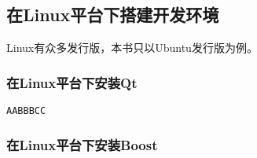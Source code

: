 ﻿%




%


\subsection{
在Linux平台下搭建开发环境
}\label{s000210}


Linux有众多发行版，本书只以Ubuntu发行版为例。


\subsubsection{
在Linux平台下安装Qt
}\label{ss000410}



\label{command000000}    %
\begin{lstlisting}[caption=GoodLuck,
title=\commandnumbernameone \thecommandnumber
]
AABBBCC
\end{lstlisting}          %





\subsubsection{
在Linux平台下安装Boost
}\label{ss000510}















